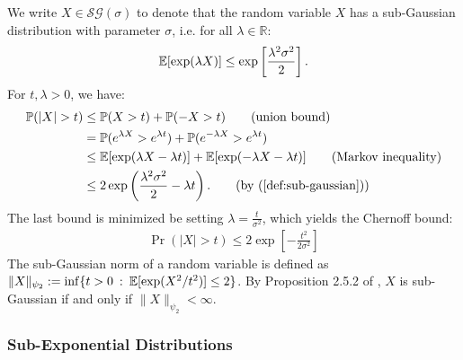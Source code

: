 We write $X\in\mathcal{SG}(\sigma)$ to denote that the random variable $X$ has a sub-Gaussian distribution with parameter $\sigma$, i.e. for all $\lambda \in \mathbb{R}$: 
\begin{align} 
    \mathbb{E}[\exp(\lambda X)] \leq \exp\left[\frac{\lambda^2\sigma^2}{2}\right]. \label{def:sub-gaussian}
\end{align}
For $t, \lambda > 0$, we have:
\begin{align}
     \Pr(|X| > t) &\leq \Pr(X > t) + \Pr(-X > t) \tag{union bound} \\
     &= \Pr(e^{\lambda X} > e^{\lambda t}) + \Pr(e^{-\lambda X} > e^{\lambda t}) \notag \\
     &\leq \E[\exp(\lambda X - \lambda t)] + \E[\exp(-\lambda X - \lambda t)] \tag{Markov inequality} \\
     &\leq 2\exp\left(\frac{\lambda^2\sigma^2}{2} - \lambda t\right). \tag{by (\ref{def:sub-gaussian})} 
\end{align}
The last bound is minimized be setting $\lambda = \frac{t}{\sigma^2}$, which yields the Chernoff bound:
\begin{align} \label{eq:chernoff}
    \Pr(|X| > t) \leq 2\exp\left[-\frac{t^2}{2\sigma^2}\right]
\end{align}
The sub-Gaussian norm of a random variable is defined as $\lVert X \rVert_{\psi_2} := \inf\{t > 0 \::\: \mathbb{E}[\exp(X^2 /t^2)] \leq 2\}$. By Proposition 2.5.2 of \cite{Vershynin18}, $X$ is sub-Gaussian if and only if $\lVert X \rVert_{\psi_2} < \infty$.

\subsubsection{Sub-Exponential Distributions}

